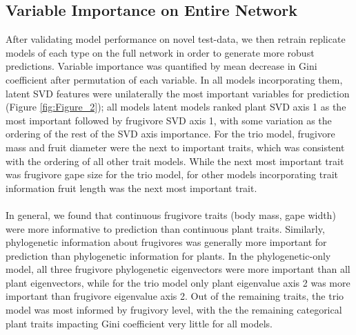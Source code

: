     
\subsection*{Variable Importance on Entire Network}
After validating model performance on novel test-data, we then retrain replicate models of each type on the full network in order to generate more robust predictions. Variable importance was quantified by mean decrease in Gini coefficient after permutation of each variable. In all models incorporating them, latent SVD features were unilaterally the most important variables for prediction (Figure \ref{fig:Figure_2}); all models latent models ranked plant SVD axis 1 as the most important followed by frugivore SVD axis 1, with some variation as the ordering of the rest of the SVD axis importance. For the trio model, frugivore mass and fruit diameter were the next to important traits, which was consistent with the ordering of all other trait models. While the next most important trait was frugivore gape size for the trio model, for other models incorporating trait information fruit length was the next most important trait. 

\paragraph*{}
In general, we found that continuous frugivore traits (body mass, gape width) were more informative to prediction than continuous plant traits. Similarly, phylogenetic information about frugivores was generally more important for prediction than phylogenetic information for plants. In the phylogenetic-only model, all three frugivore phylogenetic eigenvectors were more important than all plant eigenvectors, while for the trio model only plant eigenvalue axis 2 was more important than frugivore eigenvalue axis 2. Out of the remaining traits, the trio model was most informed by frugivory level, with the the remaining categorical plant traits impacting Gini coefficient very little for all models. 



